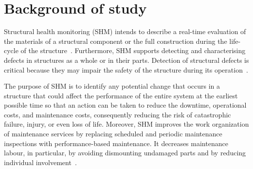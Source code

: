 \chapter[Background of study]{Background of study}
\label{ch2}
Structural health monitoring (SHM) intends to describe a real-time evaluation of the materials of a structural component or the full construction during the life-cycle of the structure~\cite{Balageas2010}. 
Furthermore, SHM supports detecting and characterising defects in structures as a whole or in their parts.
Detection of structural defects is critical because they may impair the safety of the structure during its operation~\cite{Yuan2016}. 

The purpose of SHM is to identify any potential change that occurs in a structure that could affect the performance of the entire system at the earliest possible time so that an action can be taken to reduce the downtime, operational costs, and maintenance costs, consequently reducing the risk of catastrophic failure, injury, or even loss of life.
Moreover, SHM improves the work organization of maintenance services by replacing scheduled and periodic maintenance inspections with performance-based maintenance.
It decreases maintenance labour, in particular, by avoiding dismounting undamaged parts and by reducing individual involvement~\cite{Balageas2010}.

